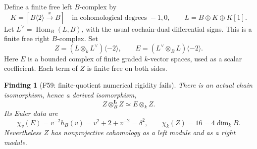 \documentclass[11pt,a4paper]{article}
\theoremstyle{named}\newtheorem{finding}{Finding}[section]
\theoremstyle{definition}\newtheorem{definition}[finding]{Definition}
\theoremstyle{remark}\newtheorem{remark}[finding]{Remark}
\begin{document}
Define a finite free left \(B\)-complex by
\[
 K=[B\langle2\rangle\xrightarrow{x}B]
       \quad\text{in cohomological degrees }-1,0,
 \qquad L=B\oplus K\oplus K[1].
\]
Let \(L^\vee=\operatorname{Hom}_B(L,B)\), with the
usual cochain-dual differential signs. This is a
finite free right \(B\)-complex. Set
\begin{equation}\label{eq:QRZE}
 Z=(L\otimes_k L^\vee)\langle-2\rangle,
 \qquad
 E=(L^\vee\otimes_B L)\langle-2\rangle.
\end{equation}
Here \(E\) is a bounded complex of finite graded
\(k\)-vector spaces, used as a scalar coefficient.
Each term of \(Z\) is finite free on both sides.

\begin{finding}[F59: finite-quotient numerical rigidity fails]\label{prop:QRfinitecountermodel}
There is an actual chain isomorphism, hence a
derived isomorphism,
\begin{equation}\label{eq:QRquadratic}
        Z\otimes_B^{\mathbf L}Z\simeq E\otimes_k Z.
\end{equation}
Its Euler data are
\begin{equation}\label{eq:QREuler}
 \chi_v(E)=v^{-2}h_B(v)=v^2+2+v^{-2}=\delta^2,
 \qquad \chi_k(Z)=16=4\dim_k B.
\end{equation}
Nevertheless \(Z\) has nonprojective cohomology
as a left module and as a right module.
\end{finding}
\end{document}
